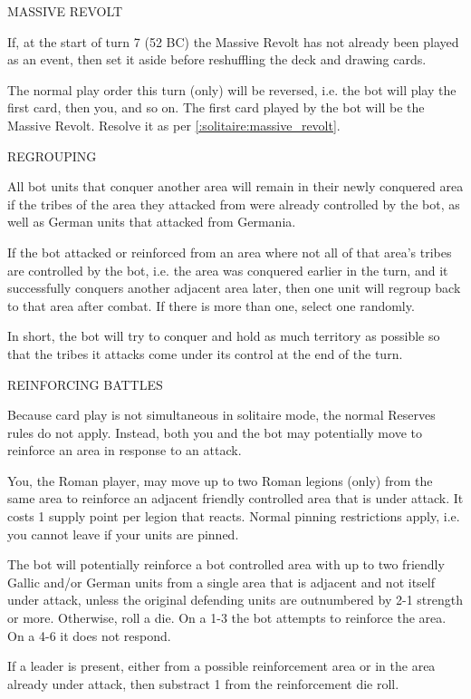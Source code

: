 MASSIVE REVOLT

If, at the start of turn 7 (52 BC) the Massive Revolt has not already been played as an event, then set it aside before reshuffling the deck and drawing cards.

The normal play order this turn (only) will be reversed, i.e. the bot will play the first card, then you, and so on. The first card played by the bot will be the Massive Revolt. Resolve it as per \ref{:solitaire:massive_revolt}.

\label{solitaire:regrouping}REGROUPING

All bot units that conquer another area will remain in their newly conquered area if the tribes of the area they attacked from were already controlled by the bot, as well as German units that attacked from Germania.

If the bot attacked or reinforced from an area where not all of that area's tribes are controlled by the bot, i.e. the area was conquered earlier in the turn, and it successfully conquers another adjacent area later, then one unit will regroup back to that area after combat. If there is more than one, select one randomly.

In short, the bot will try to conquer and hold as much territory as possible so that the tribes it attacks come under its control at the end of the turn.

\label{solitaire:reinforcing_battles}REINFORCING BATTLES

Because card play is not simultaneous in solitaire mode, the normal Reserves rules do not apply. Instead, both you and the bot may potentially move to reinforce an area in response to an attack.

You, the Roman player, may move up to two Roman legions (only) from the same area to reinforce an adjacent friendly controlled area that is under attack. It costs 1 supply point per legion that reacts. Normal pinning restrictions apply, i.e. you cannot leave if your units are pinned.

The bot will potentially reinforce a bot controlled area with up to two friendly Gallic and/or German units from a single area that is adjacent and not itself under attack, unless the original defending units are outnumbered by 2-1 strength or more. Otherwise, roll a die. On a 1-3 the bot attempts to reinforce the area. On a 4-6 it does not respond.

If a leader is present, either from a possible reinforcement area or in the area already under attack, then substract 1 from the reinforcement die roll.

